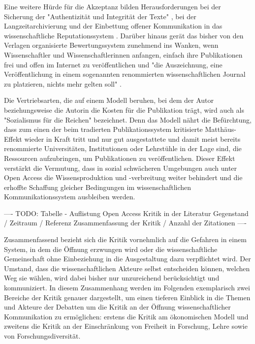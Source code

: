 Eine weitere Hürde für die Akzeptanz bilden Herausforderungen bei der Sicherung der "Authentizität und Integrität der Texte" \cite{weishaupt_2009_goldenOA} \cite[:191]{Fehling_2014}, bei der Langzeitarchivierung \cite{hagner_2015_sache_buches} \cite{Martin_2013} und der Einbettung offener Kommunikation in das wissenschaftliche Reputationssystem \cite{weishaupt_2009_goldenOA} \cite{Suber_2002} \cite{Adema_2014_open_access}. Darüber hinaus gerät das bisher von den Verlagen organisierte Bewertungssystem zunehmend ins Wanken, wenn Wissenschaftler und Wissenschaftlerinnen anfangen, einfach ihre Publikationen frei und offen im Internet zu veröffentlichen und "die Auszeichnung, eine Veröffentlichung in einem sogenannten renommierten wissenschaftlichen Journal zu platzieren, nichts mehr gelten soll" \cite{Schirmbacher_oa_2007}.

Die Vertriebsarten, die auf einem Modell beruhen, bei dem der Autor beziehungsweise die Autorin die Kosten für die Publikation trägt, wird auch als "Sozialismus für die Reichen" \cite{cope2014future} bezeichnet. Denn das Modell nährt die Befürchtung, dass zum einen der beim tradierten Publikationssystem kritisierte Matthäus-Effekt wieder in Kraft tritt und nur gut ausgestattete und damit meist bereits renommierte Universitäten, Institutionen oder Lehrstühle in der Lage sind, die Ressourcen aufzubringen, um Publikationen zu veröffentlichen. Dieser Effekt verstärkt die Vermutung, dass in sozial schwächeren Umgebungen auch unter Open Access die Wissensproduktion und -verbreitung weiter behindert und die erhoffte Schaffung gleicher Bedingungen im wissenschaftlichen Kommunikationssystem ausbleiben werden.

---- TODO: Tabelle - Auflistung Open Access Kritik in der Literatur Gegenstand / Zeitraum / Referenz Zusammenfassung der Kritik / Anzahl der Zitationen ----

Zusammenfassend bezieht sich die Kritik vornehmlich auf die Gefahren in einem System, in dem die Öffnung erzwungen wird oder die wissenschaftliche Gemeinschaft ohne Einbeziehung in die Ausgestaltung dazu verpflichtet wird. Der Umstand, dass die wissenschaftlichen Akteure selbst entscheiden können, welchen Weg sie wählen, wird dabei bisher nur unzureichend berücksichtigt und kommuniziert. In diesem Zusammenhang werden im Folgenden exemplarisch zwei Bereiche der Kritik genauer dargestellt, um einen tieferen Einblick in die Themen und Akteure der Debatten um die Kritik an der Öffnung wissenschaftlicher Kommunikation zu ermöglichen: erstens die Kritik am ökonomischen Modell und zweitens die Kritik an der Einschränkung von Freiheit in Forschung, Lehre sowie von Forschungsdiversität.

